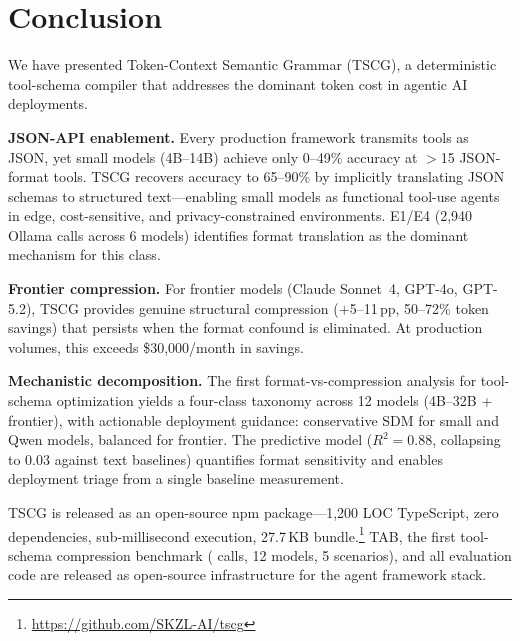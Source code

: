 \section{Conclusion}
\label{sec:conclusion}

We have presented Token-Context Semantic Grammar (TSCG), a deterministic tool-schema compiler that addresses the dominant token cost in agentic AI deployments.

\textbf{JSON-API enablement.} Every production framework transmits tools as JSON, yet small models (4B--14B) achieve only 0--49\% accuracy at $>$15 JSON-format tools.
TSCG recovers accuracy to 65--90\% by implicitly translating JSON schemas to structured text---enabling small models as functional tool-use agents in edge, cost-sensitive, and privacy-constrained environments.
E1/E4 (2{,}940 Ollama calls across 6 models) identifies format translation as the dominant mechanism for this class.

\textbf{Frontier compression.} For frontier models (Claude Sonnet~4, GPT-4o, GPT-5.2), TSCG provides genuine structural compression ($+$5--11\,pp, 50--72\% token savings) that persists when the format confound is eliminated.
At production volumes, this exceeds \$30{,}000/month in savings.

\textbf{Mechanistic decomposition.} The first format-vs-compression analysis for tool-schema optimization yields a four-class taxonomy across 12 models (4B--32B + frontier), with actionable deployment guidance: conservative SDM for small and Qwen models, balanced for frontier.
The predictive model ($R^2{=}0.88$, collapsing to 0.03 against text baselines) quantifies format sensitivity and enables deployment triage from a single baseline measurement.

TSCG is released as an open-source npm package---1{,}200 LOC TypeScript, zero dependencies, sub-millisecond execution, 27.7\,KB bundle.\footnote{\url{https://github.com/SKZL-AI/tscg}}
TAB, the first tool-schema compression benchmark (\tscgTotalCalls{} calls, 12 models, 5 scenarios), and all evaluation code are released as open-source infrastructure for the agent framework stack.

